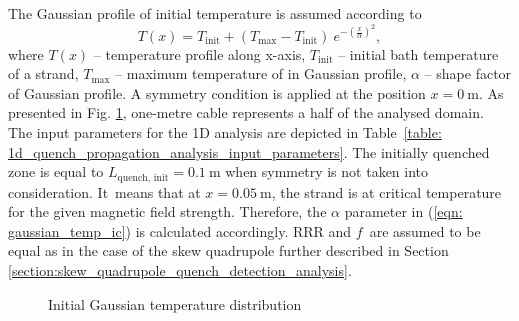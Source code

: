 The Gaussian profile of initial temperature is assumed according to 
\begin{equation}
    T(x) = T_\text{init} + (T_\text{max} - T_\text{init}) ~ e^{-(\frac{x}{\alpha})^2},
    \label{eqn: gaussian_temp_ic}
\end{equation}
where $T(x)$ -- temperature profile along x-axis, $T_\text{init}$ -- initial bath temperature of a strand, $T_\text{max}$ -- maximum temperature of in Gaussian profile, $\alpha$ -- shape factor of Gaussian profile. A symmetry condition is applied at the position $x=0~\text{m}$. As presented in Fig. \ref{fig: init_gauss_temp_distr}, one-metre cable represents a half of the analysed domain. The input parameters for the 1D analysis are depicted in Table~\ref{table: 1d_quench_propagation_analysis_input_parameters}. The initially quenched zone is equal to $L_\text{quench, init}= 0.1~\text{m}$ when symmetry is not taken into consideration. It~means that at $x=0.05~\text{m}$, the strand is at critical temperature for the given magnetic field strength. Therefore, the $\alpha$ parameter in (\ref{eqn: gaussian_temp_ic}) is calculated accordingly. RRR and $f$~are assumed to be equal as in the case of the skew quadrupole further described in Section \ref{section:skew_quadrupole_quench_detection_analysis}. 

\begin{figure}[h!]
\centering
    \caption{Initial Gaussian temperature distribution}
    \label{fig: init_gauss_temp_distr}
\end{figure}

